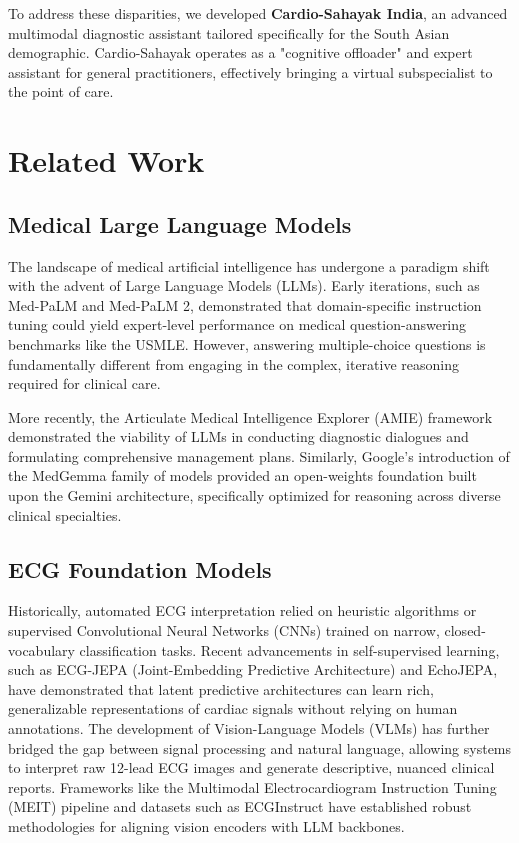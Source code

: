 \documentclass[11pt,a4paper]{article}
\begin{document}
To address these disparities, we developed \textbf{Cardio-Sahayak India}, an advanced multimodal diagnostic assistant tailored specifically for the South Asian demographic. Cardio-Sahayak operates as a "cognitive offloader" and expert assistant for general practitioners, effectively bringing a virtual subspecialist to the point of care.

\section{Related Work}

\subsection{Medical Large Language Models}
The landscape of medical artificial intelligence has undergone a paradigm shift with the advent of Large Language Models (LLMs). Early iterations, such as Med-PaLM and Med-PaLM 2, demonstrated that domain-specific instruction tuning could yield expert-level performance on medical question-answering benchmarks like the USMLE. However, answering multiple-choice questions is fundamentally different from engaging in the complex, iterative reasoning required for clinical care. 

More recently, the Articulate Medical Intelligence Explorer (AMIE) framework demonstrated the viability of LLMs in conducting diagnostic dialogues and formulating comprehensive management plans. Similarly, Google's introduction of the MedGemma family of models provided an open-weights foundation built upon the Gemini architecture, specifically optimized for reasoning across diverse clinical specialties.

\subsection{ECG Foundation Models}
Historically, automated ECG interpretation relied on heuristic algorithms or supervised Convolutional Neural Networks (CNNs) trained on narrow, closed-vocabulary classification tasks. Recent advancements in self-supervised learning, such as ECG-JEPA (Joint-Embedding Predictive Architecture) and EchoJEPA, have demonstrated that latent predictive architectures can learn rich, generalizable representations of cardiac signals without relying on human annotations. The development of Vision-Language Models (VLMs) has further bridged the gap between signal processing and natural language, allowing systems to interpret raw 12-lead ECG images and generate descriptive, nuanced clinical reports. Frameworks like the Multimodal Electrocardiogram Instruction Tuning (MEIT) pipeline and datasets such as ECGInstruct have established robust methodologies for aligning vision encoders with LLM backbones.
\end{document}
